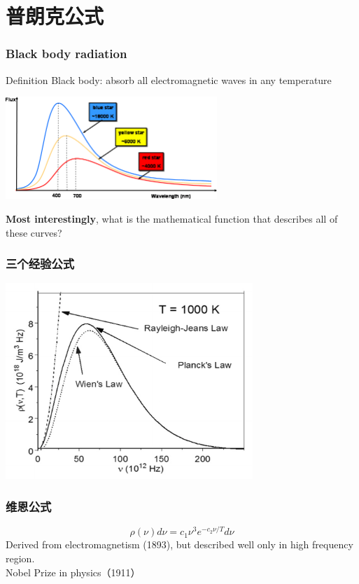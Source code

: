 \section{普朗克公式}

\begin{frame}
    \frametitle{Black body radiation}
    \begin{tcolorbox1}{Definition}
    Black body:  absorb all electromagnetic waves in any temperature
    \end{tcolorbox1}
    \begin{center}
        \includegraphics[width=0.6\textwidth]{figs/blackbody_radn_curves.png}
    \end{center}
    \textbf{\color{deepred} Most interestingly}, what is the mathematical function that describes all of these curves?
\end{frame}

\begin{frame}
    \frametitle{三个经验公式}
    \begin{center}
        \includegraphics[width=0.7\textwidth]{figs/threelaws.png}
    \end{center}
\end{frame}

\begin{frame} [t]
    \frametitle{维恩公式}
    \begin{equation*}
        \rho(\nu) d \nu=c_{1} \nu^{3} e^{-c_{2} \nu / T} d \nu 
    \end{equation*}
    Derived from electromagnetism (1893), but described well only in high frequency region.\\ 
    {\color{deepred} Nobel Prize in physics（1911）}\\
\end{frame}

